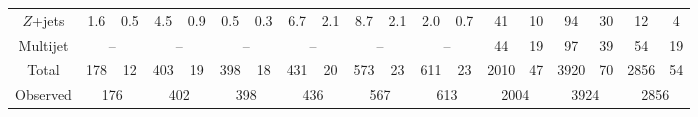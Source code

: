 \begin{table}[tbp]
\begin{center}
{\begin{tabular}{| c | c@{\ $\pm$\ }c c@{\ $\pm$\ }c c@{\ $\pm$\ }c | c@{\ $\pm$\ }c  c@{\ $\pm$\ }c c@{\ $\pm$\ }c | c@{\ $\pm$\ }c  c@{\ $\pm$\ }c c@{\ $\pm$\ }c |}
				$Z$+jets&                    1.6 &         0.5&                    4.5 &         0.9&                    0.5 &         0.3&                    6.7 &         2.1&                    8.7 &         2.1&                    2.0 &         0.7&                     41 &          10&                     94 &          30&                     12 &           4\\
				Multijet&\multicolumn{2}{c}{   --}             &\multicolumn{2}{c}{   --}             &\multicolumn{2}{c|}{   --}             &\multicolumn{2}{c}{   --}             &\multicolumn{2}{c}{   --}             &\multicolumn{2}{c|}{   --}             &                     44 &          19&                     97 &          39&                     54 &          19\\
				\hline
				Total&                    178 &          12&                    403 &          19&                    398 &          18&                    431 &          20&                    573 &          23&                    611 &          23&                   2010 &          47&                   3920 &          70&                   2856 &          54\\
				\hline
				Observed&\multicolumn{2}{c}{ 176}             &\multicolumn{2}{c}{ 402}             &\multicolumn{2}{c|}{ 398}             &\multicolumn{2}{c}{ 436}             &\multicolumn{2}{c}{ 567}             &\multicolumn{2}{c|}{ 613}             &\multicolumn{2}{c}{2004}             &\multicolumn{2}{c}{3924}             &\multicolumn{2}{c|}{2856}             \\
				\hline
				\hline
			\end{tabular}
		}
		\label{tab:yields_VBFWW}
	\end{center}
\end{table}
